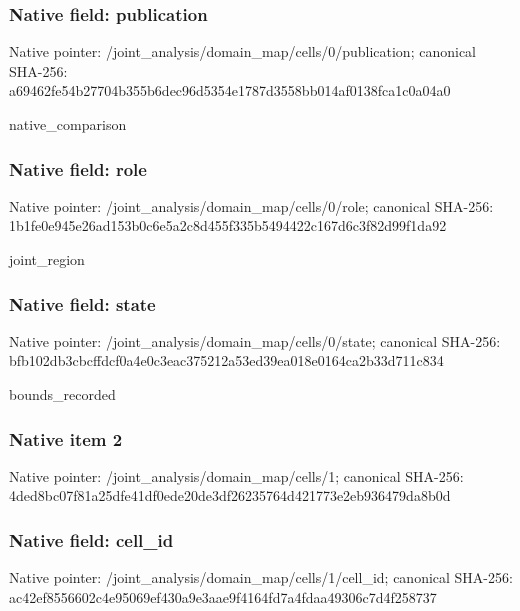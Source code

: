 \documentclass[10pt,a4paper]{article}
\begin{document}
\subsubsection{Native field: publication}
Native pointer: /joint\_\allowbreak{}analysis/domain\_\allowbreak{}map/cells/0/publication; canonical SHA-256: a69462fe54b27704b355b6dec96d5354e1787d3558bb014af0138fca1c0a04a0

\begingroup\raggedright\sloppy native\_\allowbreak{}comparison\par\endgroup

\subsubsection{Native field: role}
Native pointer: /joint\_\allowbreak{}analysis/domain\_\allowbreak{}map/cells/0/role; canonical SHA-256: 1b1fe0e945e26ad153b0c6e5a2c8d455f335b5494422c167d6c3f82d99f1da92

\begingroup\raggedright\sloppy joint\_\allowbreak{}region\par\endgroup

\subsubsection{Native field: state}
Native pointer: /joint\_\allowbreak{}analysis/domain\_\allowbreak{}map/cells/0/state; canonical SHA-256: bfb102db3cbcffdcf0a4e0c3eac375212a53ed39ea018e0164ca2b33d711c834

\begingroup\raggedright\sloppy bounds\_\allowbreak{}recorded\par\endgroup

\subsubsection{Native item 2}
Native pointer: /joint\_\allowbreak{}analysis/domain\_\allowbreak{}map/cells/1; canonical SHA-256: 4ded8bc07f81a25dfe41df0ede20de3df26235764d421773e2eb936479da8b0d

\subsubsection{Native field: cell\_\allowbreak{}id}
Native pointer: /joint\_\allowbreak{}analysis/domain\_\allowbreak{}map/cells/1/cell\_\allowbreak{}id; canonical SHA-256: ac42ef8556602c4e95069ef430a9e3aae9f4164fd7a4fdaa49306c7d4f258737
\end{document}
